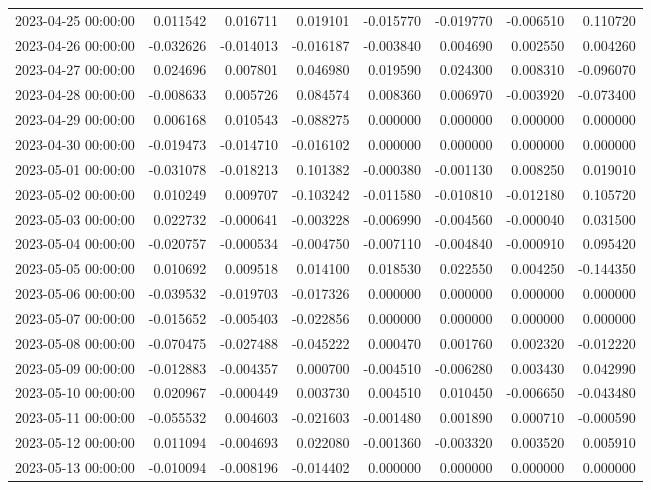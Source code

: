\begin{tabular}{lrrrrrrr}
2023-04-25 00:00:00 & 0.011542 & 0.016711 & 0.019101 & -0.015770 & -0.019770 & -0.006510 & 0.110720 \\
2023-04-26 00:00:00 & -0.032626 & -0.014013 & -0.016187 & -0.003840 & 0.004690 & 0.002550 & 0.004260 \\
2023-04-27 00:00:00 & 0.024696 & 0.007801 & 0.046980 & 0.019590 & 0.024300 & 0.008310 & -0.096070 \\
2023-04-28 00:00:00 & -0.008633 & 0.005726 & 0.084574 & 0.008360 & 0.006970 & -0.003920 & -0.073400 \\
2023-04-29 00:00:00 & 0.006168 & 0.010543 & -0.088275 & 0.000000 & 0.000000 & 0.000000 & 0.000000 \\
2023-04-30 00:00:00 & -0.019473 & -0.014710 & -0.016102 & 0.000000 & 0.000000 & 0.000000 & 0.000000 \\
2023-05-01 00:00:00 & -0.031078 & -0.018213 & 0.101382 & -0.000380 & -0.001130 & 0.008250 & 0.019010 \\
2023-05-02 00:00:00 & 0.010249 & 0.009707 & -0.103242 & -0.011580 & -0.010810 & -0.012180 & 0.105720 \\
2023-05-03 00:00:00 & 0.022732 & -0.000641 & -0.003228 & -0.006990 & -0.004560 & -0.000040 & 0.031500 \\
2023-05-04 00:00:00 & -0.020757 & -0.000534 & -0.004750 & -0.007110 & -0.004840 & -0.000910 & 0.095420 \\
2023-05-05 00:00:00 & 0.010692 & 0.009518 & 0.014100 & 0.018530 & 0.022550 & 0.004250 & -0.144350 \\
2023-05-06 00:00:00 & -0.039532 & -0.019703 & -0.017326 & 0.000000 & 0.000000 & 0.000000 & 0.000000 \\
2023-05-07 00:00:00 & -0.015652 & -0.005403 & -0.022856 & 0.000000 & 0.000000 & 0.000000 & 0.000000 \\
2023-05-08 00:00:00 & -0.070475 & -0.027488 & -0.045222 & 0.000470 & 0.001760 & 0.002320 & -0.012220 \\
2023-05-09 00:00:00 & -0.012883 & -0.004357 & 0.000700 & -0.004510 & -0.006280 & 0.003430 & 0.042990 \\
2023-05-10 00:00:00 & 0.020967 & -0.000449 & 0.003730 & 0.004510 & 0.010450 & -0.006650 & -0.043480 \\
2023-05-11 00:00:00 & -0.055532 & 0.004603 & -0.021603 & -0.001480 & 0.001890 & 0.000710 & -0.000590 \\
2023-05-12 00:00:00 & 0.011094 & -0.004693 & 0.022080 & -0.001360 & -0.003320 & 0.003520 & 0.005910 \\
2023-05-13 00:00:00 & -0.010094 & -0.008196 & -0.014402 & 0.000000 & 0.000000 & 0.000000 & 0.000000 \\

\end{tabular}
